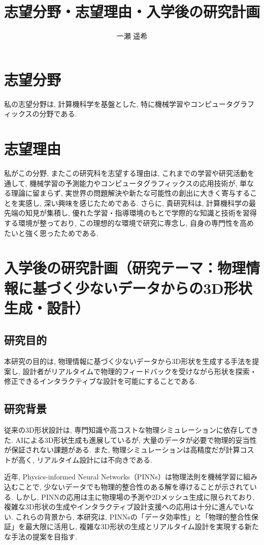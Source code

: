 \documentclass[dvipdfmx]{jsarticle}
\makeatletter
\renewcommand{\maketitle}{
  \begin{center}
    {\Large\bfseries \@title \par}
    \vspace{0.1em}
    {\normalsize \@author \par}
  \end{center}
  \vspace{-1.5em}
}
\makeatother
\begin{document}
\title{志望分野・志望理由・入学後の研究計画}
\author{一瀬 遥希}
\date{}
\maketitle

\section{志望分野}
私の志望分野は, 計算機科学を基盤とした, 特に機械学習やコンピュータグラフィックスの分野である.

\section{志望理由}
私がこの分野, またこの研究科を志望する理由は, これまでの学習や研究活動を通して, 機械学習の予測能力やコンピュータグラフィックスの応用技術が, 単なる理論に留まらず, 実世界の問題解決や新たな可能性の創出に大きく寄与することを実感し, 深い興味を感じたためである. さらに, 貴研究科は, 計算機科学の最先端の知見が集積し, 優れた学習・指導環境のもとで学際的な知識と技術を習得する環境が整っており, この理想的な環境で研究に専念し, 自身の専門性を高めたいと強く思ったためである.

\section{入学後の研究計画（研究テーマ：物理情報に基づく少ないデータからの3D形状生成・設計）}

\subsection{研究目的}
本研究の目的は, 物理情報に基づく少ないデータから3D形状を生成する手法を提案し, 設計者がリアルタイムで物理的フィードバックを受けながら形状を探索・修正できるインタラクティブな設計を可能にすることである.

\subsection{研究背景}
従来の3D形状設計は, 専門知識や高コストな物理シミュレーションに依存してきた. AIによる3D形状生成も進展しているが, 大量のデータが必要で物理的妥当性が保証されない課題がある. また, 物理シミュレーションは高精度だが計算コストが高く, リアルタイム設計には不向きである.

近年, Physics-informed Neural Networks（PINNs）は物理法則を機械学習に組み込むことで, 少ないデータでも物理的整合性のある解を導けることが示されている\cite{Cuomo2022}.
しかし, PINNの応用は主に物理場の予測や2Dメッシュ生成に限られており, 複雑な3D形状の生成やインタラクティブ設計支援への応用は十分に進んでいない\cite{Cuomo2022, Peng2023, Xu2024}.
これらの背景から, 本研究は, PINNsの「データ効率性」と「物理的整合性保証」を最大限に活用し, 複雑な3D形状の生成とリアルタイム設計を実現する新たな手法の提案を目指す.
\end{document}
